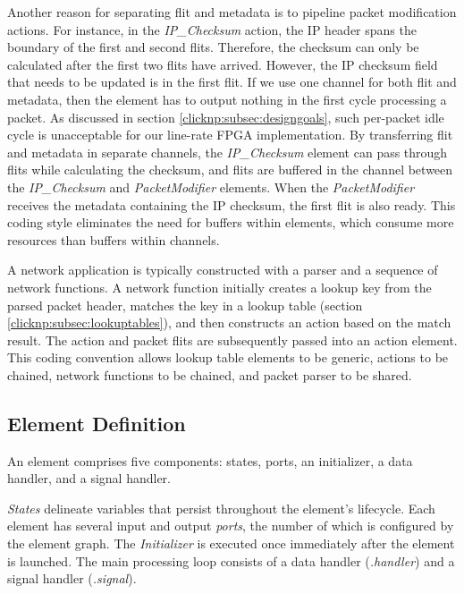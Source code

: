 Another reason for separating flit and metadata is to pipeline packet modification actions. For instance, in the \textit{IP\_Checksum} action, the IP header spans the boundary of the first and second flits. Therefore, the checksum can only be calculated after the first two flits have arrived. However, the IP checksum field that needs to be updated is in the first flit. If we use one channel for both flit and metadata, then the element has to output nothing in the first cycle processing a packet. As discussed in section \ref{clicknp:subsec:designgoals}, such per-packet idle cycle is unacceptable for our line-rate FPGA implementation. By transferring flit and metadata in separate channels, the \textit{IP\_Checksum} element can pass through flits while calculating the checksum, and flits are buffered in the channel between the \textit{IP\_Checksum} and \textit{PacketModifier} elements. When the \textit{PacketModifier} receives the metadata containing the IP checksum, the first flit is also ready. This coding style eliminates the need for buffers within elements, which consume more resources than buffers within channels.

A network application is typically constructed with a parser and a sequence of network functions. A network function initially creates a lookup key from the parsed packet header, matches the key in a lookup table (section \ref{clicknp:subsec:lookuptables}), and then constructs an action based on the match result. The action and packet flits are subsequently passed into an action element. This coding convention allows lookup table elements to be generic, actions to be chained, network functions to be chained, and packet parser to be shared.

\subsection{Element Definition}
\label{clicknp:subsec:elementdef}

An element comprises five components: states, ports, an initializer, a data handler, and a signal handler.

\textit{States} delineate variables that persist throughout the element's lifecycle. Each element has several input and output \textit{ports}, the number of which is configured by the element graph. The \textit{Initializer} is executed once immediately after the element is launched. The main processing loop consists of a data handler (\textit{.handler}) and a signal handler (\textit{.signal}).


